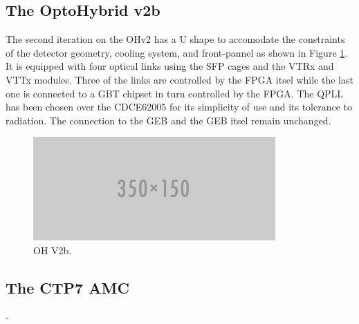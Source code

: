     \subsection{The OptoHybrid v2b}

      The second iteration on the OHv2 has a U shape to accomodate the constraints of the detector geometry, cooling system, and front-pannel as shown in Figure \ref{fig:II-2-daq-ohv2b}. It is equipped with four optical links using the SFP cages and the VTRx and VTTx modules. Three of the links are controlled by the FPGA itsel while the last one is connected to a GBT chipset in turn controlled by the FPGA. The QPLL has been chosen over the CDCE62005 for its simplicity of use and its tolerance to radiation. The connection to the GEB and the GEB itsel remain unchanged.

      \begin{figure}[h!]
        \centering
        \includegraphics[width=\textwidth]{img/empty.png}
        \caption{OH V2b.}
        \label{fig:II-2-daq-ohv2b}
      \end{figure}

    \subsection{The CTP7 AMC}

      































-
